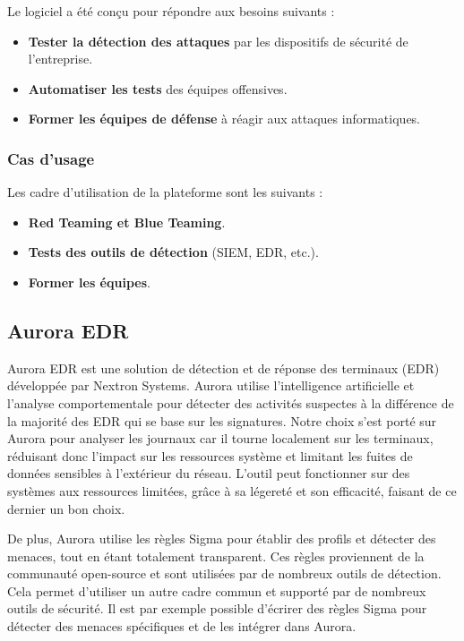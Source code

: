\documentclass[12pt,letterpaper]{article}
\begin{document}
Le logiciel a été conçu pour répondre aux besoins suivants :
\begin{itemize}
    \item \textbf{Tester la détection des attaques} par les dispositifs de sécurité de l'entreprise.
    \item \textbf{Automatiser les tests} des équipes offensives.
    \item \textbf{Former les équipes de défense} à réagir aux attaques informatiques.
\end{itemize}

\subsubsection{Cas d'usage}

Les cadre d'utilisation de la plateforme sont les suivants :
\begin{itemize}
    \item \textbf{Red Teaming et Blue Teaming}.
    \item \textbf{Tests des outils de détection} (SIEM, EDR, etc.).
    \item \textbf{Former les équipes}.
\end{itemize}

\subsection{Aurora EDR}

Aurora EDR est une solution de détection et de réponse des terminaux (EDR) développée par Nextron Systems.
Aurora utilise l'intelligence artificielle et l'analyse comportementale pour détecter des activités suspectes à la différence de la majorité des EDR qui se base sur les signatures. 
Notre choix s'est porté sur Aurora pour analyser les journaux car il tourne localement sur les terminaux, réduisant donc l'impact sur les ressources système et limitant les fuites de données sensibles à l'extérieur du réseau.
L'outil peut fonctionner sur des systèmes aux ressources limitées, grâce à sa légereté et son efficacité, faisant de ce dernier un bon choix.

\bigskip

De plus, Aurora utilise les règles Sigma pour établir des profils et détecter des menaces, tout en étant totalement transparent.
Ces règles proviennent de la communauté open-source et sont utilisées par de nombreux outils de détection.
Cela permet d'utiliser un autre cadre commun et supporté par de nombreux outils de sécurité.
Il est par exemple possible d'écrirer des règles Sigma pour détecter des menaces spécifiques et de les intégrer dans Aurora.
\end{document}
